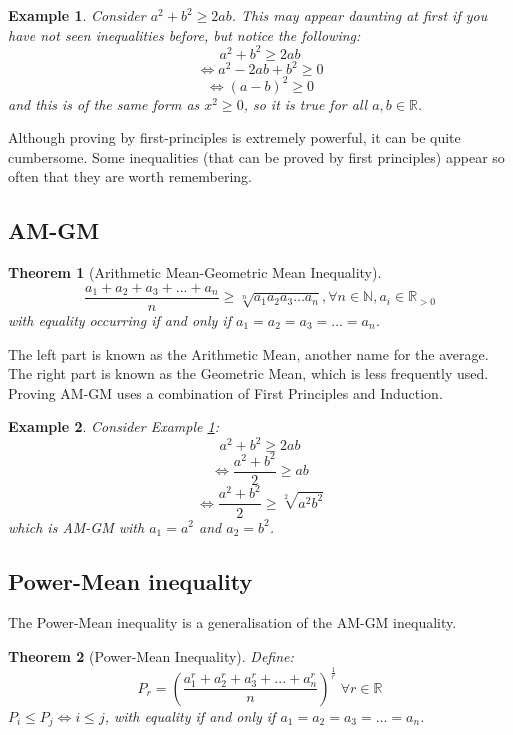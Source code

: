 \documentclass[a4paper,12pt]{article}
\newtheorem{example}{Example}[section]
\newtheorem{theorem}{Theorem}[section]
\begin{document}
\begin{example}
    \label{basicfirstprinc}
    Consider $a^2 + b^2 \geq 2ab$. This may appear daunting at first if you have not seen inequalities before, but notice the following:
    $$a^2 + b^2 \geq 2ab$$
    $$\iff a^2 - 2ab + b^2 \geq 0$$
    $$\iff (a - b)^2 \geq 0$$
    and this is of the same form as $x^2 \geq 0$, so it is true for all $a, b \in \mathbb{R}$. \\
\end{example}

Although proving by first-principles is extremely powerful, it can be quite cumbersome. Some inequalities (that can be proved by first principles) appear so often that they are worth remembering.

\subsection{AM-GM}
\begin{theorem}[Arithmetic Mean-Geometric Mean Inequality]
$$\frac{a_1 + a_2 + a_3 + ... + a_n}{n} \geq \sqrt[n]{a_1a_2a_3...a_n}, \forall n \in \mathbb{N}, a_i \in \mathbb{R}_{> 0}$$
with equality occurring if and only if $a_1 = a_2 = a_3 = ... = a_n$.\\
\end{theorem}

The left part is known as the Arithmetic Mean, another name for the average. The right part is known as the Geometric Mean, which is less frequently used. Proving AM-GM uses a combination of First Principles and Induction.

\begin{example}
    Consider Example \ref{basicfirstprinc}:
    $$a^2 + b^2 \geq 2ab$$
$$\iff \frac{a^2 + b^2}{2} \geq ab$$
$$\iff \frac{a^2 + b^2}{2} \geq \sqrt[2]{a^2b^2}$$
which is AM-GM with $a_1 = a^2$ and $a_2 = b^2$.
\end{example}

\subsection{Power-Mean inequality}
The Power-Mean inequality is a generalisation of the AM-GM inequality. 

\begin{theorem}[Power-Mean Inequality]
Define:
$$P_r = (\frac{a_1^r + a_2^r + a_3^r + ... + a_n^r}{n})^{\frac{1}{r}} \; \forall r \in \mathbb{R}$$
$P_i \leq P_j \iff i \leq j$, with equality if and only if $a_1 = a_2 = a_3 = ... = a_n$.
\end{theorem}
\end{document}
